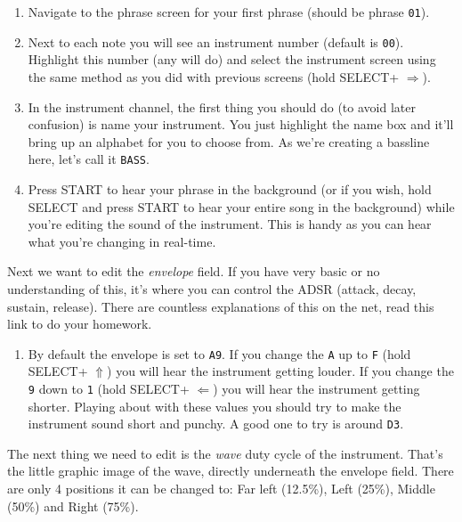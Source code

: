 \documentclass[]{article}
\newcommand{\buttonStyle}[1]{\textsf{#1}\xspace}
\newcommand{\buttonSymbolStyle}[1]{$\bm{#1}$\xspace}
\newcommand{\bStart}{\buttonStyle{{START}}}
\newcommand{\bSelect}{\buttonStyle{{SELECT}}}
\newcommand{\bRight}{\buttonSymbolStyle{\Rightarrow}}
\newcommand{\bLeft}{\buttonSymbolStyle{\Leftarrow}}
\newcommand{\bUp}{\buttonSymbolStyle{\Uparrow}}
\newcommand{\nb}[1]{\texttt{#1}\xspace}
\begin{document}
\begin{enumerate}
	
\item Navigate to the phrase screen for your first phrase (should be phrase \nb{01}).

\item Next to each note you will see an instrument number (default is \nb{00}). Highlight this number (any will do) and select the instrument screen using the same method as you did with previous screens (hold \bSelect + \bRight).

\item In the instrument channel, the first thing you should do (to avoid later confusion) is name your instrument. You just highlight the name box and it'll bring up an alphabet for you to choose from. As we're creating a bassline here, let's call it \nb{BASS}.

\item Press \bStart to hear your phrase in the background (or if you wish, hold \bSelect and press \bStart to hear your entire song in the background) while you're editing the sound of the instrument. This is handy as you can hear what you're changing in real-time.

\end{enumerate}

Next we want to edit the \textit{envelope} field. If you have very basic or no understanding of this, it's where you can control the ADSR (attack, decay, sustain, release). There are countless explanations of this on the net, read this link to do your homework.

\begin{enumerate}[resume]

\item By default the envelope is set to \nb{A9}. If you change the \nb{A} up to \nb{F} (hold \bSelect + \bUp) you will hear the instrument getting louder. If you change the \nb{9} down to \nb{1} (hold \bSelect + \bLeft) you will hear the instrument getting shorter. Playing about with these values you should try to make the instrument sound short and punchy. A good one to try is around \nb{D3}.

\end{enumerate}

The next thing we need to edit is the \textit{wave} duty cycle of the instrument. That's the little graphic image of the wave, directly underneath the envelope field. There are only 4 positions it can be changed to: Far left (12.5\%), Left (25\%), Middle (50\%) and Right (75\%). 
\end{document}
